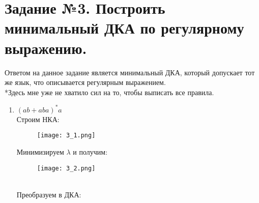\documentclass[12pt, a4paper]{article}
\begin{document}
\section{Задание №3. Построить минимальный ДКА по регулярному выражению.}
Ответом на данное задание является минимальный ДКА, который допускает тот же язык, что описывается регулярным выражением.
\\*Здесь мне уже не хватило сил на то, чтобы выписать все правила.
\begin{enumerate}
    \item \((ab+aba)^*a\)
\\Строим НКА:
\begin{comment}
digraph {
    rankdir="LR"
    "" [shape=point]
    q1 [shape=circle]
    q2 [shape=circle]
    q3 [shape=circle]
    q4 [shape=circle]
    q5 [shape=circle]
    q6 [shape=circle]
    q7 [shape=circle]
    q8 [shape=circle]
    q9 [shape=circle]
    q10 [shape=circle]
    q11 [shape=circle]
    q12 [shape=doublecircle]

    "" -> q1 
    q1 -> q2 [label="λ"]
    q2 -> q3 [label="λ"]
    q3 -> q4 [label="a"]
    q4 -> q5 [label="b"]
    q5 -> q6 [label="λ"]
    q2 -> q7 [label="λ"]
    q7 -> q8 [label="a"]
    q8 -> q9 [label="b"]
    q9 -> q10 [label="a"]
    q10 -> q6 [label="λ"]
    q6 -> q11 [label="λ"]
    q11 -> q12 [label="a"]
    q6 -> q2 [label="λ"]
    q1 -> q11 [label="λ"]
}
\end{comment}
    \begin{figure}[H]
        \centering
        \texttt{[image: 3\_1.png]}
    \end{figure}
Минимизируем \(\lambda\) и получим:
\begin{comment}
digraph {
    rankdir="LR"
    "" [shape=point]
    q1 [shape=circle]
    q2 [shape=circle]
    q3 [shape=circle]
    q4 [shape=circle]
    q5 [shape=circle]
    q6 [shape=circle]
    q7 [shape=circle]
    q8 [shape=circle]
    q9 [shape=circle]
    q10 [shape=doublecircle]

    "" -> q1 
    q1 -> q2 [label="λ"]
    q2 -> q3 [label="a"]
    q3 -> q4 [label="b"]
    q4 -> q5 [label="λ"]
    q1 -> q6 [label="λ"]
    q6 -> q7 [label="a"]
    q7 -> q8 [label="b"]
    q8 -> q9 [label="a"]
    q9 -> q5 [label="λ"]
    q5 -> q10 [label="a"]
    q5 -> q1 [label="λ"]
    q1 -> q5 [label="λ"]
}
\end{comment}
    \begin{figure}[H]
        \centering
        \texttt{[image: 3\_2.png]}
    \end{figure}
\\Преобразуем в ДКА:
\begin{comment}
digraph {
    rankdir="LR"
    "" [shape=point]
    "{q1q2q5q9}" [shape=circle]
    "{q3,q7,q10}" [shape=doublecircle]
    "{q4q8}" [shape=circle]
    "{q3,q7,q9,q10}" [shape=doublecircle]


\end{comment}
\end{enumerate}
\end{document}
